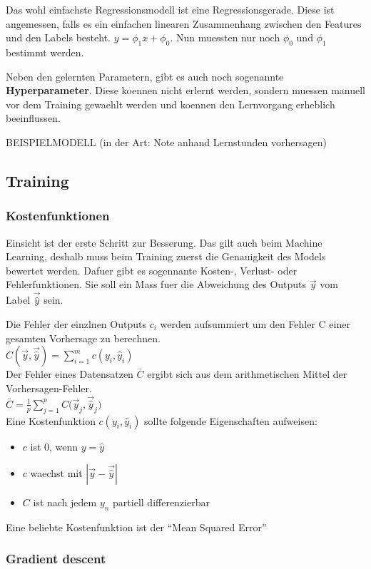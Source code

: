 \documentclass[../main]{subfiles}
\begin{document}
Das wohl einfachste Regressionsmodell ist eine Regressionsgerade. Diese ist angemessen, falls es ein einfachen linearen Zusammenhang zwischen den Features und den Labels besteht.
$y=\phi_1x + \phi_0$. Nun muessten nur noch $\phi_0$ und $\phi_1$ bestimmt werden. 

Neben den gelernten Parametern, gibt es auch noch sogenannte \textbf{Hyperparameter}. Diese koennen nicht erlernt werden, sondern muessen manuell vor dem Training gewaehlt werden und koennen den Lernvorgang erheblich beeinflussen.

BEISPIELMODELL (in der Art: Note anhand Lernstunden vorhersagen)

\subsection{Training}
\subsubsection{Kostenfunktionen}
Einsicht ist der erste Schritt zur Besserung. Das gilt auch beim Machine Learning, deshalb muss beim Training zuerst die Genauigkeit des Models bewertet werden.
Dafuer gibt es sogennante Kosten-, Verlust- oder Fehlerfunktionen. Sie soll ein Mass fuer die Abweichung des Outputs $\vec{y}$ vom Label $\vec{\hat{y}}$ sein.\par

Die Fehler der einzlnen Outputs $c_i$ werden aufsummiert um den Fehler C einer gesamten Vorhersage zu berechnen.\\
$C(\vec{y},\vec{\hat{y}})=\displaystyle\sum_{i=1}^{m} c(y_i, \hat{y}_i)$\\
Der Fehler eines Datensatzen $\bar{C}$ ergibt sich aus dem arithmetischen Mittel der Vorhersagen-Fehler.\\
$\bar{C} = \frac{1}{p}\displaystyle\sum_{j=1}^{p} C\Big(\vec{y}_j,\vec{\hat{y}}_j\Big)$\\
%
Eine Kostenfunktion $c(y_i,\hat{y}_i)$ sollte folgende Eigenschaften aufweisen:
\begin{itemize}
    \item{$c$ ist $0$, wenn $y = \hat{y}$}
    \item{$c$ waechst mit $|\vec{y}-\vec{\hat{y}}|$}
    \item{$C$ ist nach jedem $y_n$ partiell differenzierbar}
\end{itemize}

Eine beliebte Kostenfunktion ist der ``Mean Squared Error''
\subsubsection{Gradient descent}
\end{document}
